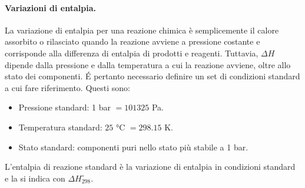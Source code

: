 \paragraph{Variazioni di entalpia.} La variazione di entalpia per una reazione chimica è semplicemente il calore assorbito o rilasciato quando la reazione avviene a pressione costante e corrisponde alla differenza di entalpia di prodotti e reagenti. Tuttavia, $\Delta H$ dipende dalla pressione e dalla temperatura a cui la reazione avviene, oltre allo stato dei componenti. \'E pertanto necessario definire un set di condizioni standard a cui fare riferimento. Questi sono: 
\begin{itemize}
    \item Pressione standard: 1 bar $=101325$ Pa.
    \item Temperatura standard: $25$ °C $=298.15$ K.
    \item Stato standard: componenti puri nello stato più stabile a 1 bar.
\end{itemize}
\begin{defn}
    L'entalpia di reazione standard è la variazione di entalpia in condizioni standard e la si indica con $\Delta H_{298}^{\circ}$.
\end{defn}

